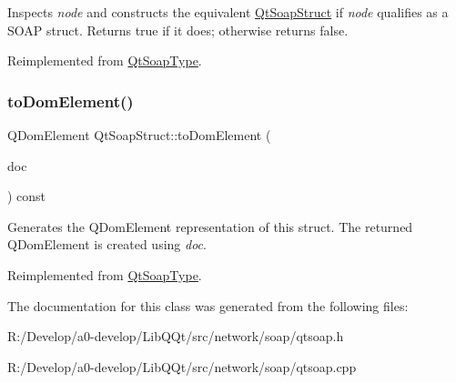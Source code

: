 Inspects {\itshape node} and constructs the equivalent \mbox{\hyperlink{class_qt_soap_struct}{Qt\+Soap\+Struct}} if {\itshape node} qualifies as a S\+O\+AP struct. Returns true if it does; otherwise returns false. 

Reimplemented from \mbox{\hyperlink{class_qt_soap_type_a935516be4d70dda7e0f7fef889b1a2b8}{Qt\+Soap\+Type}}.

\mbox{\label{class_qt_soap_struct_a3a57e002d42e8d048b0c0bf9678ff2f9}} 
\subsubsection{\texorpdfstring{to\+Dom\+Element()}{toDomElement()}}
{\footnotesize\ttfamily Q\+Dom\+Element Qt\+Soap\+Struct\+::to\+Dom\+Element (\begin{DoxyParamCaption}\item[{Q\+Dom\+Document}]{doc }\end{DoxyParamCaption}) const\hspace{0.3cm}{\ttfamily [virtual]}}

Generates the Q\+Dom\+Element representation of this struct. The returned Q\+Dom\+Element is created using {\itshape doc}. 

Reimplemented from \mbox{\hyperlink{class_qt_soap_type_a77b7274ffbc9374187a2cc8cca27cdb6}{Qt\+Soap\+Type}}.



The documentation for this class was generated from the following files\+:\begin{DoxyCompactItemize}
\item 
R\+:/\+Develop/a0-\/develop/\+Lib\+Q\+Qt/src/network/soap/qtsoap.\+h\item 
R\+:/\+Develop/a0-\/develop/\+Lib\+Q\+Qt/src/network/soap/qtsoap.\+cpp\end{DoxyCompactItemize}
